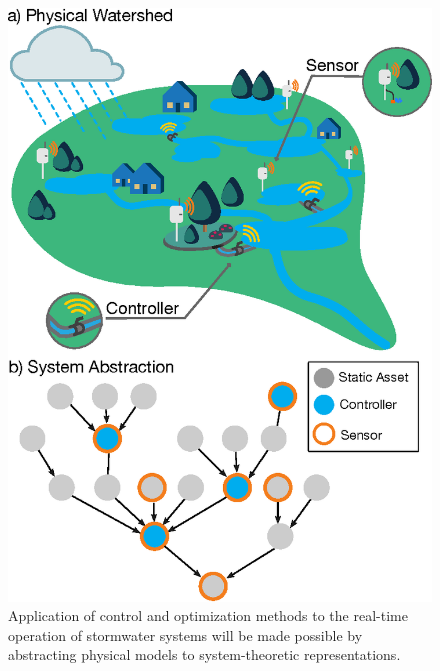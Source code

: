 \

\begin{figure}
\includegraphics{gfx/Chapter-1/k-drawing.eps} 
\caption{Application of control and optimization methods to the real-time operation of stormwater systems will be made possible by abstracting physical models to system-theoretic representations.}\label{fig-ch1:vision}
\end{figure}



